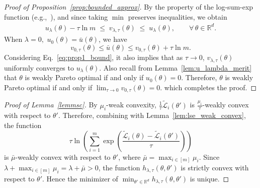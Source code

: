 \documentclass[sigconf]{acmart}
\begin{document}
\begin{proof}[Proof of Proposition~\ref{prop:bounded_approx}]
By the property of the log-sum-exp function (e.g.,~\cite{beck2012smoothing}), and since taking $\min$ preserves inequalities, we obtain
\begin{align}
\label{eq:prop1_bound}
u_\lambda(\theta) - \tau \ln m
\;\le\;
v_{\lambda,\tau}(\theta)
\;\le\;
u_\lambda(\theta),
\qquad \forall\,\theta\in \mathbb{R}^d .
\end{align}
When $\lambda=0,$ $u_0(\theta)= \bar{u}(\theta)$, we have 
$$v_{0,\tau}(\theta) \le \bar{u}(\theta)\leq v_{0,\tau}(\theta) + \tau\ln m. $$
Considering Eq.~\eqref{eq:prop1_bound}, it also implies that as $\tau\rightarrow 0$, $v_{\lambda,\tau}(\theta)$ uniformly converges to $u_\lambda(\theta)$. Also recall from Lemma~\ref{lem:u_lambda_merit} that $\theta$ is weakly Pareto optimal if and only if $u_0(\theta)=0$. Therefore, $\theta$ is weakly Pareto optimal if and only if $\lim_{\tau\rightarrow 0} v_{0,\tau}(\theta)=0$. which completes the proof.
\end{proof}



\begin{proof}[Proof of Lemma~\ref{lemmsc}]
By $\mu_i$-weak convexity, $\frac{1}{\tau}\tilde{\mathcal{L}}_i(\theta')$ is $\frac{\mu_i}{\tau}$-weakly convex with respect to $\theta'$. Therefore, combining with Lemma~\ref{lem:lse_weak_convex}, the function
\[
\tau\ln\!\left(
\sum_{i=1}^m \exp\!\left(\frac{\tilde{\mathcal{L}}_i(\theta)-\tilde{\mathcal{L}}_i(\theta')}{\tau}\right)
\right)
\]
is $\bar{\mu}$-weakly convex with respect to $\theta'$, where $\bar{\mu}=\max_{i\in[m]}\mu_i$. Since $\lambda+\max_{i\in[m]}\mu_i=\lambda+\bar{\mu}>0$, the function $h_{\lambda,\tau}(\theta,\theta')$ is strictly convex with respect to $\theta'$. Hence the minimizer of $\min_{\theta'\in \mathbb{R}^d} h_{\lambda,\tau}(\theta,\theta')$ is unique.
\end{proof}
\end{document}
